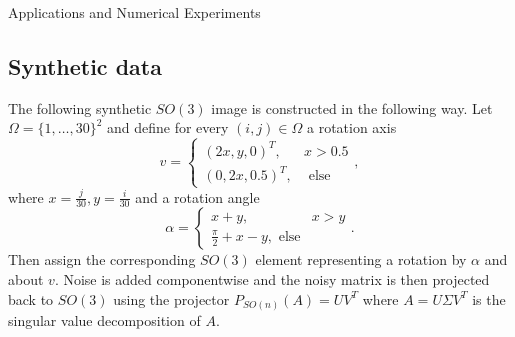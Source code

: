 \begin{chapter}{Applications and Numerical Experiments}
\subsection{Synthetic data} %
\label{sub:SyntheticdataSO}
The following synthetic $SO(3)$ image is constructed in the following way. Let $\Omega=\lbrace 1,\ldots,30 \rbrace^2$ and define for every $(i,j)\in\Omega$
a rotation axis
\begin{equation}
	v = \begin{cases}
	    (2x,y,0)^{T}, & x>0.5\\
	    (0,2x,0.5)^{T}, & \text{ else}
	\end{cases},
\end{equation}
where $x=\frac{j}{30}, y=\frac{i}{30}$ and a rotation angle
\begin{equation}
    \alpha = \begin{cases}
	   x + y, & x > y\\
	   \frac{\pi}{2} + x - y, \text{ else}
    \end{cases}.
\end{equation}
Then assign the corresponding $SO(3)$ element representing a rotation by $\alpha$ and about $v$. Noise is added componentwise and the noisy matrix is
then projected back to $SO(3)$ using the projector $P_{SO(n)}(A)=UV^{T}$ where $A=U\Sigma V^T$ is the singular value decomposition of $A$.


\end{chapter}
